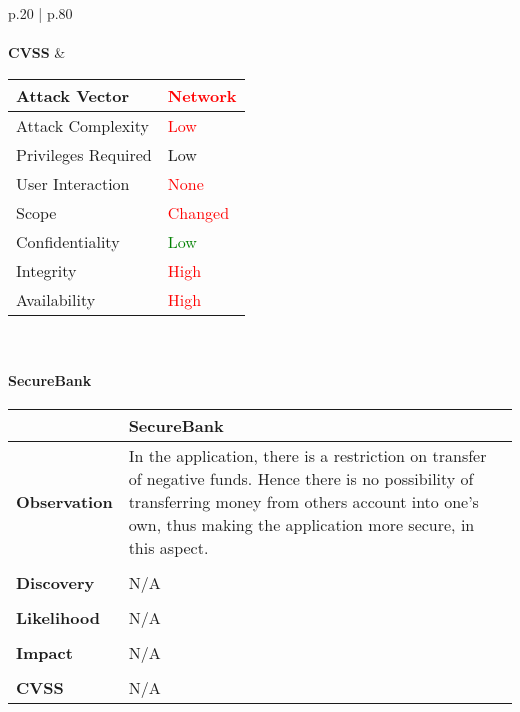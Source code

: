 \begin{longtable*}{p{.20\textwidth} | p{.80\textwidth}}
    \\\\
    \textbf{CVSS} &
      \begin{tabular}{| l | l |}
           \hline
           Attack Vector		& \textcolor{red}{Network}\\
           \hline
           Attack Complexity	& \textcolor{red}{Low} \\
           \hline
           Privileges Required & \textcolor{BurntOrange}{Low} \\
           \hline
           User Interaction	& \textcolor{red}{None} \\
           \hline
           Scope		& \textcolor{red}{Changed} \\
           \hline
           Confidentiality	& \textcolor{Green}{Low} \\
           \hline
           Integrity		& \textcolor{red}{High} \\
           \hline
           Availability		& \textcolor{red}{High} \\
           \hline
           \end{tabular}
    \\
    \hline
\end{longtable*}
\paragraph{SecureBank} \mbox{}
\begin{longtable*}{p{.20\textwidth} | p{.80\textwidth}}
    \hline
    & \textbf{SecureBank} \\
    \hline
    \textbf{Observation} &
       In the application, there is a restriction on transfer of negative funds. Hence there is no possibility of transferring money from others account into one's own, thus making the application more secure, in this aspect.
    \\\\
    \textbf{Discovery} &
    N/A
    \\\\
    \textbf{Likelihood} &
     N/A
    \\\\
    \textbf{Impact} &
      N/A
    \\\\
    \textbf{CVSS} &
    N/A
    \\
    \hline
\end{longtable*}
\clearpage